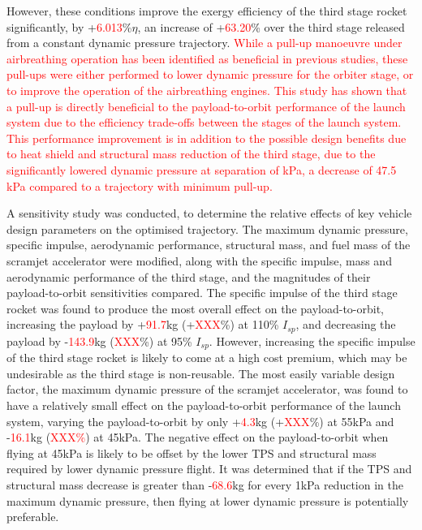   However, these conditions improve the exergy efficiency of the third stage rocket significantly, by +\textcolor{red}{6.013}\%$\eta$, an increase of +\textcolor{red}{63.20}\% over the third stage released from a constant dynamic pressure trajectory. \textcolor{red}{While a pull-up manoeuvre under airbreathing operation has been identified as beneficial in previous studies\cite{Wilhite1991,Bradford2002,Fujikawa2017}, these pull-ups were either performed to lower dynamic pressure for the orbiter stage\cite{Wilhite1991,Bradford2002}, or to improve the operation of the airbreathing engines\cite{Fujikawa2017}. This study has shown that a pull-up is directly beneficial to the payload-to-orbit performance of the launch system due to the efficiency trade-offs between the stages of the launch system. This performance improvement is in addition to the possible design benefits due to heat shield and structural mass reduction of the third stage, due to the significantly lowered dynamic pressure at separation of \secondthirdSeparationqStandardNoReturn kPa, a decrease of 47.5 kPa compared to a trajectory with minimum pull-up.}


A sensitivity study was conducted, to determine the relative effects of key vehicle design parameters on the optimised trajectory. 
The maximum dynamic pressure, specific impulse, aerodynamic performance, structural mass, and fuel mass of the scramjet accelerator were modified, along with the specific impulse, mass and aerodynamic performance of the third stage, and the magnitudes of their payload-to-orbit sensitivities compared. 
The specific impulse of the third stage rocket was found to produce the most overall effect on the payload-to-orbit, increasing the payload by +\textcolor{red}{91.7}kg (+\textcolor{red}{XXX}\%) at 110\% $I_{sp}$, and decreasing the payload by -\textcolor{red}{143.9}kg (\textcolor{red}{XXX}\%) at 95\% $I_{sp}$. However, increasing the specific impulse of the third stage rocket is likely to come at a high cost premium, which may be undesirable as the third stage is non-reusable. 
The most easily variable design factor, the maximum dynamic pressure of the scramjet accelerator, was found to have a relatively small effect on the payload-to-orbit performance of the launch system, varying the payload-to-orbit by only +\textcolor{red}{4.3}kg (+\textcolor{red}{XXX}\%) at 55kPa and -\textcolor{red}{16.1}kg (\textcolor{red}{XXX\%}) at 45kPa. The negative effect on the payload-to-orbit when flying at 45kPa is likely to be offset by the lower TPS and structural mass required by lower dynamic pressure flight. It was determined that if the TPS and structural mass decrease is greater than -\textcolor{red}{68.6}kg for every 1kPa reduction in the maximum dynamic pressure, then flying at lower dynamic pressure is potentially preferable. 







